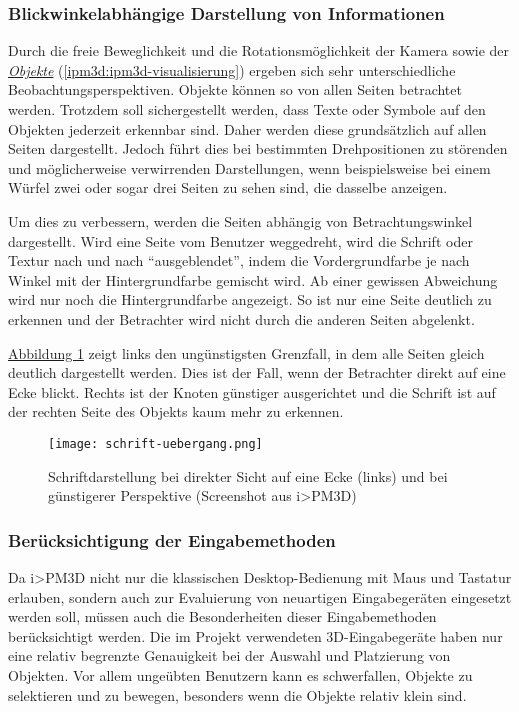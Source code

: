\documentclass[a4paper,10pt]{sphinxmanual}
\begin{document}
\subsubsection{Blickwinkelabhängige Darstellung von Informationen}
\label{visualisierung:blickwinkelabhangige-darstellung-von-informationen}
Durch die freie Beweglichkeit und die Rotationsmöglichkeit der Kamera sowie der {\hyperref[ipm3d:ipm3d-visualisierung]{\emph{Objekte}}} (\autoref*{ipm3d:ipm3d-visualisierung}) ergeben sich sehr unterschiedliche Beobachtungsperspektiven.
Objekte können so von allen Seiten betrachtet werden.
Trotzdem soll sichergestellt werden, dass Texte oder Symbole auf den Objekten jederzeit erkennbar sind. Daher werden diese grundsätzlich auf allen Seiten dargestellt.
Jedoch führt dies bei bestimmten Drehpositionen zu störenden und möglicherweise verwirrenden Darstellungen, wenn beispielsweise bei einem Würfel zwei oder sogar drei Seiten zu sehen sind, die dasselbe anzeigen.

Um dies zu verbessern, werden die Seiten abhängig von Betrachtungswinkel dargestellt.
Wird eine Seite vom Benutzer weggedreht, wird die Schrift oder Textur nach und nach "`ausgeblendet"', indem die Vordergrundfarbe je nach Winkel mit der Hintergrundfarbe gemischt wird.
Ab einer gewissen Abweichung wird nur noch die Hintergrundfarbe angezeigt. So ist nur eine Seite deutlich zu erkennen und der Betrachter wird nicht durch die anderen Seiten abgelenkt.

\hyperref[visualisierung:schrift-uebergang]{Abbildung  \ref*{visualisierung:schrift-uebergang}} zeigt links den ungünstigsten Grenzfall, in dem alle Seiten gleich deutlich dargestellt werden. Dies ist der Fall, wenn der Betrachter direkt auf eine Ecke blickt.
Rechts ist der Knoten günstiger ausgerichtet und die Schrift ist auf der rechten Seite des Objekts kaum mehr zu erkennen.
\begin{figure}[htbp]
\centering
\capstart

\texttt{[image: schrift-uebergang.png]}
\caption{Schriftdarstellung bei direkter Sicht auf eine Ecke (links) und bei günstigerer Perspektive (Screenshot aus i\textgreater{}PM3D)}\label{visualisierung:schrift-uebergang}\end{figure}


\subsubsection{Berücksichtigung der Eingabemethoden}
\label{visualisierung:berucksichtigung-der-eingabemethoden}
Da i\textgreater{}PM3D nicht nur die klassischen Desktop-Bedienung mit Maus und Tastatur erlauben, sondern auch zur Evaluierung von neuartigen Eingabegeräten eingesetzt werden soll, müssen auch die Besonderheiten dieser Eingabemethoden berücksichtigt werden.
Die im Projekt verwendeten 3D-Eingabegeräte \cite{buchi} haben nur eine relativ begrenzte Genauigkeit bei der Auswahl und Platzierung von Objekten.
Vor allem ungeübten Benutzern kann es schwerfallen, Objekte zu selektieren und zu bewegen, besonders wenn die Objekte relativ klein sind.
\end{document}
